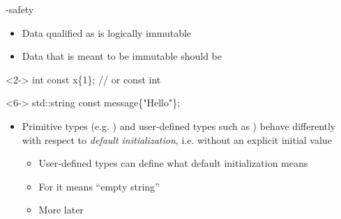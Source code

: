 \begin{frame}[fragile]{-safety}

  \begin{itemize}
  \item Data qualified as  is logically immutable
  \item Data that is meant to be immutable should be 
  \end{itemize}

  \begin{codeblock}<2->{
int \alert{const} x\{1\}; // or const int
}\end{codeblock}

\begin{codeblock}<6->{
std::string \alert{const} message\{"Hello"\};
}\end{codeblock}

  \begin{itemize}[<10->]
  \item Primitive types (e.g. ) and user-defined types such as
    ) behave differently with respect to \textit{default
      initialization}, i.e. without an explicit initial value
    \begin{itemize}
    \item User-defined types can define what default initialization means
    \item For  it means ``empty string''
    \item More later
    \end{itemize}
  \end{itemize}

\end{frame}
